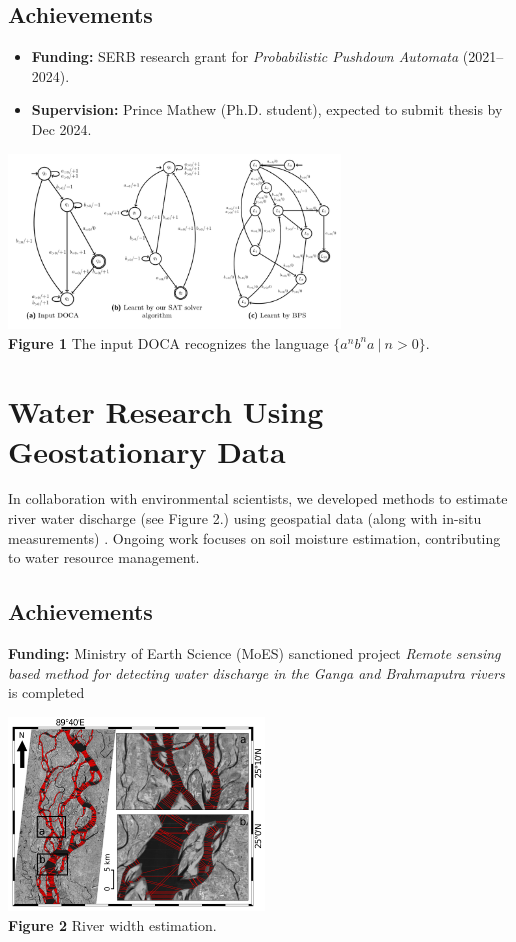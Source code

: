 \documentclass[11pt,a4paper,sans]{moderncv} %
\begin{document}
\subsection{Achievements}
\begin{itemize}
    \item \textbf{Funding:} SERB research grant for \emph{Probabilistic Pushdown Automata} (2021--2024).
    \item \textbf{Supervision:} Prince Mathew (Ph.D. student), expected to submit thesis by Dec 2024.
\end{itemize}
\begin{minipage}{\textwidth}
\begin{center}
\includegraphics[width=0.66\textwidth]{doca.png} \\
\textbf{Figure 1} The input DOCA recognizes the language $\{a^nb^na ~|~ n > 0\}$.
\end{center}
\end{minipage}

\section{Water Research Using Geostationary Data}
In collaboration with environmental scientists, we developed methods to estimate river water discharge (see Figure 2.) using geospatial data (along with in-situ measurements) \cite{esd21}. Ongoing work focuses on soil moisture estimation, contributing to water resource management.

\subsection{Achievements}
\textbf{Funding:} Ministry of Earth Science (MoES) sanctioned project \emph{Remote sensing based method
for detecting water discharge in the Ganga and Brahmaputra rivers} is completed

\begin{minipage}{\textwidth}
\begin{center}
\includegraphics[width=0.51\textwidth]{river-width.png} \\
  \textbf{Figure 2} River width estimation.
\end{center}
\end{minipage}
\end{document}
